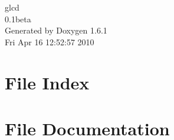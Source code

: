 \documentclass[a4paper]{book}
\begin{document}
\begin{titlepage}
\vspace*{7cm}
\begin{center}
{\Large glcd \\[1ex]\large 0.1beta }\\
\vspace*{1cm}
{\large Generated by Doxygen 1.6.1}\\
\vspace*{0.5cm}
{\small Fri Apr 16 12:52:57 2010}\\
\end{center}
\end{titlepage}
\clearemptydoublepage
{}
\tableofcontents
\clearemptydoublepage
{}
\chapter{File Index}

\chapter{File Documentation}












\printindex
\end{document}
